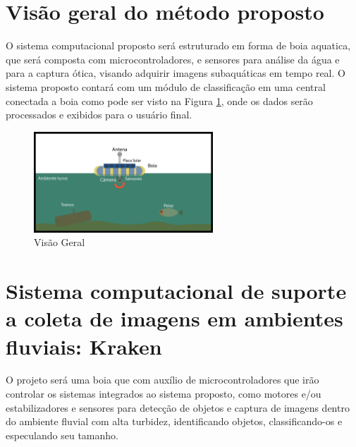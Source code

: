 \section{Visão geral do método proposto}
   
O sistema computacional proposto será estruturado em forma de boia aquatica, que será composta com microcontroladores, e sensores para análise da água e para a captura ótica, visando adquirir imagens subaquáticas em tempo real. O sistema proposto contará com um módulo de classificação em uma central conectada a boia como pode ser visto na Figura \ref{fig:bigpic}, onde os dados serão processados e exibidos para o usuário final. 
   

\begin{figure}[ht]
	\centering
    \caption{\label{fig:bigpic}Visão Geral}
	\includegraphics[width = 0.6\textwidth]{resources/bugpicturefloater}
\end{figure}


\section{Sistema computacional de suporte a coleta de imagens em ambientes fluviais: Kraken}

O projeto será uma boia que com auxílio de microcontroladores que irão controlar os sistemas integrados ao sistema proposto, como motores e/ou estabilizadores e sensores para detecção de objetos e captura de imagens dentro do ambiente fluvial com alta turbidez, identificando objetos, classificando-os e especulando seu tamanho.

